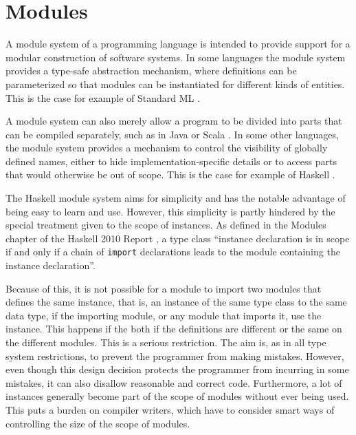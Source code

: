 \documentclass[msc]{ppgccufmg}
\begin{document}
\section{Modules}

A module system of a programming language is intended to provide
support for a modular construction of software systems.  In some
languages the module system provides a type-safe abstraction
mechanism, where definitions can be parameterized so that
modules can be instantiated for different kinds of
entities. This is the case for example of Standard ML \citep{sml}.

A module system can also merely allow a program to
be divided into parts that can be compiled separately, such as in Java \citep{java} or Scala \citep{scala}.
In some other
languages, the module system provides a mechanism to control the
visibility of globally defined names, either to hide
implementation-specific details or to access parts that would
otherwise be out of scope. This is the case for example of Haskell
\citep[chapter~5]{report}.

The Haskell module system aims for simplicity \citep[section~8.2]{history}
and has the notable advantage of being easy to learn and use. However,
this simplicity is partly hindered by the special treatment given to
the scope of instances. As defined in the Modules chapter of the
Haskell 2010 Report \citep[section~5.4]{report}, a type class
``instance declaration is in scope if and only if a chain of
\texttt{import} declarations leads to the module containing the
instance declaration''.

Because of this, it is not possible for a module to import two modules that defines the same instance, that is, an instance of the same type class to the same data type, if the importing module, or any module that imports it, use the instance.  This happens if the both if the definitions are different or the same on the different modules.  This is a
serious
restriction. The aim is, as in all type system restrictions, to
prevent the programmer from making mistakes.  However, even though
this design decision protects the programmer from incurring in some
mistakes, it can also disallow reasonable and correct code.
Furthermore, a lot of instances generally become part of the scope of
modules without ever being used.  This puts a burden on compiler
writers, which have to consider smart ways of controlling the size of
the scope of modules.
\end{document}
